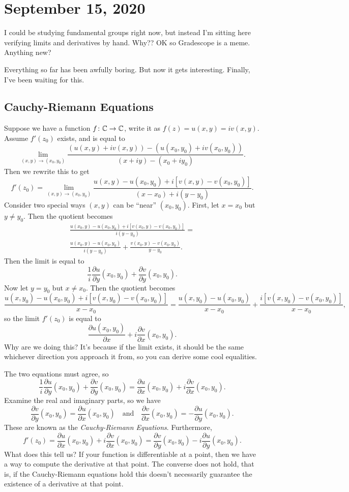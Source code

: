 \section{September 15, 2020}
I could be studying fundamental groups right now, but instead I'm sitting here verifying limits and derivatives by hand. Why?? OK so Gradescope is a meme. Anything new?

Everything so far has been awfully boring. But now it gets interesting. Finally, I've been waiting for this.

\subsection{Cauchy-Riemann Equations}
Suppose we have a function $f \colon \mathbb{C} \to \mathbb{C}$, write it as $f(z)=u(x,y)=iv(x,y)$. Assume $f'(z_0)$ exists, and is equal to \[
    \lim_{(x,y)\to (x_0,y_0)}\frac{\left( u(x,y)+iv(x,y) \right) -\left( u(x_0,y_0)+iv(x_0,y_0) \right) }{(x+iy)-(x_0+iy_0)}.
\] Then we rewrite this to get \[
f'(z_0)=\lim_{(x,y)\to (x_0,y_0)}\frac{u(x,y)-u(x_0,y_0)+i\left[ v(x,y)-v(x_0,y_0) \right] }{(x-x_0)+i(y-y_0)}.
\] Consider two special ways $(x,y)$ can be ``near'' $(x_0,y_0)$. First, let $x=x_0$ but $y\neq y_0$. Then the quotient becomes 
\begin{gather*}
\frac{u(x_0,y)-u(x_0,y_0)+i[v(x_0,y)-v(x_0,y_0)]}{i(y-y_0)}=\\
\frac{u(x_0,y)-u(x_0,y_0)}{i(y-y_0)}+\frac{v(x_0,y)-v(x_0,y_0)}{y-y_0}.
\end{gather*} Then the limit is equal to \[
\frac{1}{i}\frac{\partial u}{\partial y}(x_0,y_0)+\frac{\partial v}{\partial y}(x_0,y_0).
\] Now let $y=y_0$ but $x\neq x_0$. Then the quotient becomes \[
\frac{u(x,y_0)-u(x_0,y_0)+i\left[ v(x,y_0)-v(x_0,y_0) \right] }{x-x_0}=\frac{u(x,y_0)-u(x_0,y_0)}{x-x_0}+\frac{i\left[ v(x,y_0)-v(x_0,y_0) \right]}{x-x_0} ,
\] so the limit $f'(z_0)$ is equal to \[
\frac{\partial u(x_0,y_0)}{\partial x}+i \frac{\partial v}{\partial x}(x_0,y_0).
\]  Why are we doing this? It's because if the limit exists, it should be the same whichever direction you approach it from, so you can derive some cool equalities.

The two equations must agree, so \[
    \frac{1}{i} \frac{\partial u}{\partial y}(x_0,y_0)+ \frac{\partial v}{\partial y}(x_0,y_0)=\frac{\partial u}{\partial x}(x_0,y_0)+i \frac{\partial v}{\partial x}(x_0,y_0).
\] Examine the real and imaginary parts, so we have 
\begin{equation}
\frac{\partial v}{\partial y}(x_0,y_0)=\frac{\partial u}{\partial x}(x_0,y_0) \quad \text{and} \quad \frac{\partial v}{\partial x}(x_0,y_0)=- \frac{\partial u}{\partial y}(x_0,y_0).
\end{equation}
 These are known as the \emph{Cauchy-Riemann Equations}. Furthermore, \[
f'(z_0)=\frac{\partial u}{\partial x}(x_0,y_0)+i \frac{\partial v}{\partial x}(x_0,y_0)=\frac{\partial v}{\partial y}(x_0,y_0)-i \frac{\partial u}{\partial y}(x_0,y_0).
\] What does this tell us? If your function is differentiable at a point, then we have a way to compute the derivative at that point. The converse does not hold, that is, if the Cauchy-Riemann equations hold this doesn't necessarily guarantee the existence of a derivative at that point.


